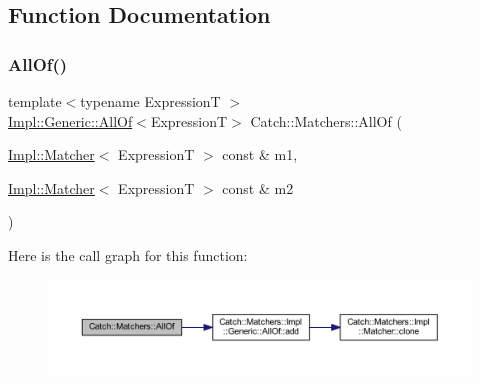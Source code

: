 \subsection{Function Documentation}
\hypertarget{namespace_catch_1_1_matchers_aca6c1c17e137d989583c97f99705797a}{}\label{namespace_catch_1_1_matchers_aca6c1c17e137d989583c97f99705797a} 
\subsubsection{\texorpdfstring{All\+Of()}{AllOf()}\hspace{0.1cm}{\footnotesize\ttfamily [1/2]}}
{\footnotesize\ttfamily template$<$typename ExpressionT $>$ \\
\hyperlink{class_catch_1_1_matchers_1_1_impl_1_1_generic_1_1_all_of}{Impl\+::\+Generic\+::\+All\+Of}$<$ExpressionT$>$ Catch\+::\+Matchers\+::\+All\+Of (\begin{DoxyParamCaption}\item[{\hyperlink{struct_catch_1_1_matchers_1_1_impl_1_1_matcher}{Impl\+::\+Matcher}$<$ ExpressionT $>$ const \&}]{m1,  }\item[{\hyperlink{struct_catch_1_1_matchers_1_1_impl_1_1_matcher}{Impl\+::\+Matcher}$<$ ExpressionT $>$ const \&}]{m2 }\end{DoxyParamCaption})\hspace{0.3cm}{\ttfamily [inline]}}

Here is the call graph for this function\+:\nopagebreak
\begin{figure}[H]
\begin{center}
\leavevmode
\includegraphics[width=350pt]{namespace_catch_1_1_matchers_aca6c1c17e137d989583c97f99705797a_cgraph}
\end{center}
\end{figure}
\hypertarget{namespace_catch_1_1_matchers_a990366f7d62d10d9752ad7b24230def0}{}\label{namespace_catch_1_1_matchers_a990366f7d62d10d9752ad7b24230def0} 

